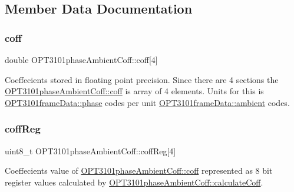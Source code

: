 \subsection{Member Data Documentation}
\mbox{\label{class_o_p_t3101phase_ambient_coff_a0174483b15a3819cf8b30fcad00f7dda}} 
\subsubsection{\texorpdfstring{coff}{coff}}
{\footnotesize\ttfamily double O\+P\+T3101phase\+Ambient\+Coff\+::coff\mbox{[}4\mbox{]}}



Coeffecients stored in floating point precision. Since there are 4 sections the \mbox{\hyperlink{class_o_p_t3101phase_ambient_coff_a0174483b15a3819cf8b30fcad00f7dda}{O\+P\+T3101phase\+Ambient\+Coff\+::coff}} is array of 4 elements. Units for this is \mbox{\hyperlink{class_o_p_t3101frame_data_a4d07c723715856ea9652b3d672d01191}{O\+P\+T3101frame\+Data\+::phase}} codes per unit \mbox{\hyperlink{class_o_p_t3101frame_data_a901d8630d15b79b558e7d7c5a9d08cc7}{O\+P\+T3101frame\+Data\+::ambient}} codes. 

\mbox{\label{class_o_p_t3101phase_ambient_coff_a7b9be6815f936c44329b53f5f57b3d6c}} 
\subsubsection{\texorpdfstring{coff\+Reg}{coffReg}}
{\footnotesize\ttfamily uint8\+\_\+t O\+P\+T3101phase\+Ambient\+Coff\+::coff\+Reg\mbox{[}4\mbox{]}}



Coeffecients value of \mbox{\hyperlink{class_o_p_t3101phase_ambient_coff_a0174483b15a3819cf8b30fcad00f7dda}{O\+P\+T3101phase\+Ambient\+Coff\+::coff}} represented as 8 bit register values calculated by \mbox{\hyperlink{class_o_p_t3101phase_ambient_coff_a926e3a0dcadac3172c34982bbf8e1bbe}{O\+P\+T3101phase\+Ambient\+Coff\+::calculate\+Coff}}. 

\mbox{\label{class_o_p_t3101phase_ambient_coff_ac2976af69df6837bd7bc1881b87f7188}} 
